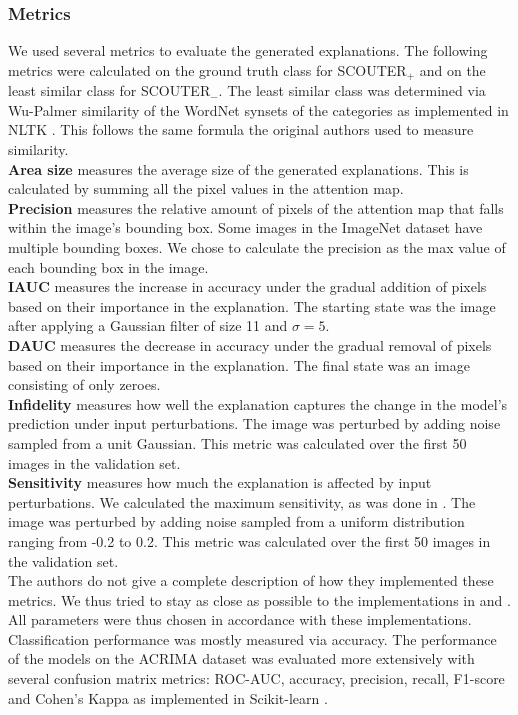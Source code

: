  \subsubsection{Metrics}
 We used several metrics to evaluate the generated explanations. The following metrics were calculated on the ground truth class for SCOUTER$_+$ and on the least similar class for SCOUTER$_-$. The least similar class was determined via Wu-Palmer similarity of the WordNet synsets of the categories as implemented in NLTK \cite{nltk}. This follows the same formula the original authors used to measure similarity.
 \\
 \textbf{Area size} measures the average size of the generated explanations. This is calculated by summing all the pixel values in the attention map.
 \\
 \textbf{Precision} measures the relative amount of pixels of the attention map that falls within the image's bounding box. Some images in the ImageNet dataset have multiple bounding boxes. We chose to calculate the precision as the max value of each bounding box in the image.
 \\
 \textbf{IAUC} measures the increase in accuracy under the gradual addition of pixels based on their importance in the explanation. The starting state was the image after applying a Gaussian filter of size 11 and $\sigma = 5$. 
 \\
 \textbf{DAUC} measures the decrease in accuracy under the gradual removal of pixels based on their importance in the explanation. The final state was an image consisting of only zeroes.
 \\
 \textbf{Infidelity} measures how well the explanation captures the change in the model's prediction under input perturbations. The image was perturbed by adding noise sampled from a unit Gaussian. This metric was calculated over the first 50 images in the validation set.
 \\
 \textbf{Sensitivity} measures how much the explanation is affected by input perturbations. We calculated the maximum sensitivity, as was done in \cite{fidelity}. The image was perturbed by adding noise sampled from a uniform distribution ranging from -0.2 to 0.2. This metric was calculated over the first 50 images in the validation set.
 \\
 The authors do not give a complete description of how they implemented these metrics. We thus tried to stay as close as possible to the implementations in \cite{rise} and \cite{fidelity}. All parameters were thus chosen in accordance with these implementations.
 \\
 Classification performance was mostly measured via accuracy. The performance of the models on the ACRIMA dataset was evaluated more extensively with several confusion matrix metrics: ROC-AUC, accuracy, precision, recall, F1-score and Cohen's Kappa as implemented in Scikit-learn \cite{scikit-learn}.

